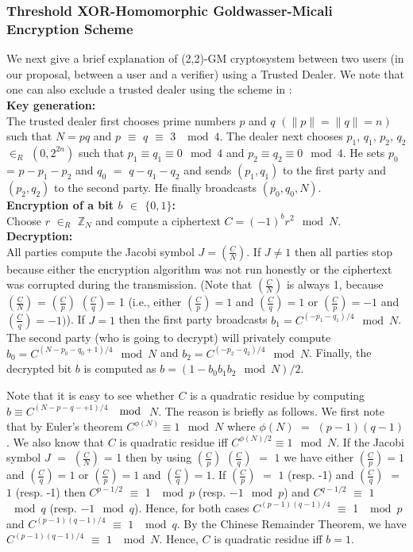 \documentclass[journal]{IEEEtran}
\begin{document}
\subsubsection{Threshold XOR-Homomorphic Goldwasser-Micali Encryption Scheme}
We next give a brief explanation of (2,2)-GM cryptosystem between two users (in our proposal, between a user and a verifier) using a Trusted Dealer. We note that one can also exclude a trusted dealer using the scheme in \cite{KY02}:\\
\textbf{Key generation:}\\
The trusted dealer first chooses prime numbers $p$ and $q$ $(\|p\| = \|q\| = n)$ such that $N=pq$ and $p$ $\equiv$ $q$ $\equiv$ $3$ $\mod 4$. The dealer next chooses $p_1$, $q_1$, $p_2$, $q_2$ $\in_R$ $(0,2^{2n})$ such that $p_1 \equiv q_1 \equiv 0 \mod 4$ and $p_2 \equiv q_2 \equiv 0 \mod 4$. He sets $p_0$ = $p - p_1 - p_2$ and $q_0$ $=$ $q - q_1 -q_2$ and sends $(p_1,q_1)$ to the first party and $(p_2,q_2)$ to the second party. He finally broadcasts $(p_0, q_0, N)$.\\
\textbf{Encryption of a bit $b$ $\in$ $\{0,1\}$:}\\
Choose $r$ $\in_R$ $\mathbb{Z}_N$ and compute a ciphertext $C = (-1)^b r^2 \mod N$.\\
\textbf{Decryption:}\\
All parties compute the Jacobi symbol $J= (\frac{C}{N})$. If $J \neq 1$ then all parties stop because either the encryption algorithm was not run honestly or the ciphertext was corrupted during the transmission. (Note that $(\frac{C}{N})$ is always 1, because $(\frac{C}{N})$ = $(\frac{C}{p})$ $(\frac{C}{q})$= 1 (i.e., either $(\frac{C}{p})=1$ and $(\frac{C}{q})=1$ or $(\frac{C}{p})=-1$ and $(\frac{C}{q})=-1)$). If $J=1$ then the first party broadcasts $b_1 = C^{{(-p_1-q_1)}/4} \mod N$. The second party (who is going to decrypt) will privately compute $b_0= C^{{(N -p_0 -q_0 +1)}/4} \mod N$ and $b_2 = C^{{(-p_2-q_2)}/4} \mod N$. Finally, the decrypted bit $b$ is computed as $b = (1-b_0 b_1 b_2 \mod N)/2$. 

Note that it is easy to see whether $C$ is a quadratic residue by computing $b\equiv C^{(N-p-q-+1)/4}$ $\mod$ $N$. The reason is briefly as follows. We first note that by Euler's theorem $C^{\phi(N)} \equiv 1 \mod N$ where $\phi(N)$ $=$ $(p-1)(q-1)$. We also know that $C$ is quadratic residue iff $C^{\phi(N)/2} \equiv 1 \mod N$. If the Jacobi symbol $J$ $=$ $(\frac{C}{N})$ = 1 then by using $(\frac{C}{p})$ $(\frac{C}{q})$ $=$ $1$ we have either $(\frac{C}{p})=1$ and $(\frac{C}{q})=1$ or $(\frac{C}{p})=1$ and $(\frac{C}{q})=1$. If $(\frac{C}{p})$ $=$ $1$ (resp. -1) and $(\frac{C}{q})$ $=$ $1$ (resp. -1) then $C^{{p-1}/2}$ $\equiv$ 1 $\mod p$ (resp. $-1 \mod p$) and $C^{{q-1}/2}$ $\equiv$ $1$ $\mod q$ (resp. $-1 \mod q$). Hence, for both cases $C^{(p-1)(q-1)/4}$ $\equiv$ 1 $\mod p$ and $C^{(p-1)(q-1)/4}$ $\equiv$ $1$ $\mod q$. By the Chinese Remainder Theorem, we have $C^{{(p-1)(q-1)}/4}$ $\equiv$ $1$ $\mod N$. Hence, $C$ is quadratic residue iff $b=1$.
\end{document}
